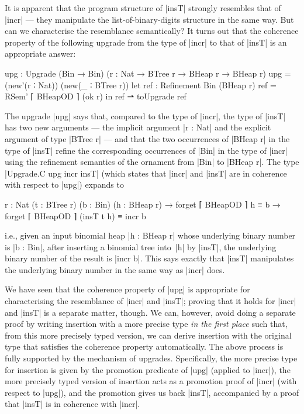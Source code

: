 It is apparent that the program structure of |insT| strongly resembles that of |incr| --- they manipulate the list-of-binary-digits structure in the same way.
But can we characterise the resemblance semantically?
It turns out that the coherence property of the following upgrade from the type of |incr| to that of |insT| is an appropriate answer:
\begin{code}
upg : Upgrade (Bin → Bin) ({r : Nat} → BTree r → BHeap r → BHeap r)
upg =  (new'(r ∶ Nat)) (new(_ ∶ BTree r))
         let  ref : Refinement Bin (BHeap r)
              ref = RSem' ⌈ BHeapOD ⌉ (ok r)
         in   ref ⇀ toUpgrade ref
\end{code}
The upgrade |upg| says that, compared to the type of |incr|, the type of |insT| has two new arguments --- the implicit argument |r : Nat| and the explicit argument of type |BTree r| --- and that the two occurrences of |BHeap r| in the type of |insT| refine the corresponding occurrences of |Bin| in the type of |incr| using the refinement semantics of the ornament from |Bin| to |BHeap r|.
The type |Upgrade.C upg incr insT| (which states that |incr| and |insT| are in coherence with respect to |upg|) expands to
\begin{code}
{r : Nat} (t : BTree r) (b : Bin) (h : BHeap r) →
forget ⌈ BHeapOD ⌉ h ≡ b → forget ⌈ BHeapOD ⌉ (insT t h) ≡ incr b
\end{code}
i.e., given an input binomial heap |h : BHeap r| whose underlying binary number is |b : Bin|, after inserting a binomial tree into~|h| by |insT|, the underlying binary number of the result is |incr b|.
This says exactly that |insT| manipulates the underlying binary number in the same way as |incr| does.

We have seen that the coherence property of |upg| is appropriate for characterising the resemblance of |incr| and |insT|; proving that it holds for |incr| and |insT| is a separate matter, though.
We can, however, avoid doing a separate proof by writing insertion with a more precise type \emph{in the first place} such that, from this more precisely typed version, we can derive insertion with the original type that satisfies the coherence property automatically.
The above process is fully supported by the mechanism of upgrades.
Specifically, the more precise type for insertion is given by the promotion predicate of |upg| (applied to |incr|), the more precisely typed version of insertion acts as a promotion proof of |incr| (with respect to |upg|), and the promotion gives us back |insT|, accompanied by a proof that |insT| is in coherence with |incr|.


